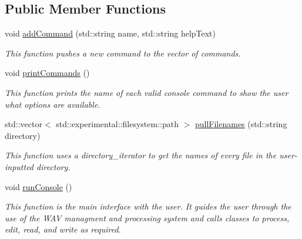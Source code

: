 \subsection*{Public Member Functions}
\begin{DoxyCompactItemize}
\item 
void \hyperlink{classWavConsole_af15680c1257375a6f687ad5c4c0b9b0c}{add\+Command} (std\+::string name, std\+::string help\+Text)
\begin{DoxyCompactList}\small\item\em This function pushes a new command to the vector of commands. \end{DoxyCompactList}\item 
\mbox{\label{classWavConsole_aef531f754faaa5592d78e15e46feb768}} 
void \hyperlink{classWavConsole_aef531f754faaa5592d78e15e46feb768}{print\+Commands} ()
\begin{DoxyCompactList}\small\item\em This function prints the name of each valid console command to show the user what options are available. \end{DoxyCompactList}\item 
std\+::vector$<$ std\+::experimental\+::filesystem\+::path $>$ \hyperlink{classWavConsole_ae5ee40c484223159f58d2758c0dba340}{pull\+Filenames} (std\+::string directory)
\begin{DoxyCompactList}\small\item\em This function uses a directory\+\_\+iterator to get the names of every file in the user-\/inputted directory. \end{DoxyCompactList}\item 
\mbox{\label{classWavConsole_af1b08107ff8d69c7515d719b7b88a164}} 
void \hyperlink{classWavConsole_af1b08107ff8d69c7515d719b7b88a164}{run\+Console} ()
\begin{DoxyCompactList}\small\item\em This function is the main interface with the user. It guides the user through the use of the W\+AV managment and processing system and calls classes to process, edit, read, and write as required. \end{DoxyCompactList}\end{DoxyCompactItemize}
